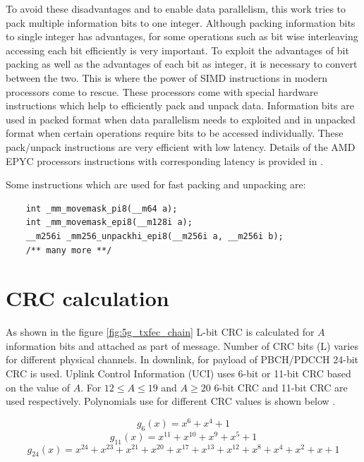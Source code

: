 To avoid these disadvantages and to enable data parallelism, this work tries to pack multiple information bits to one integer. Although packing information bits to single integer has advantages, for some operations such as bit wise interleaving accessing each bit efficiently is very important. To exploit the advantages of bit packing as well as the advantages of each bit as integer, it is necessary to convert between the two. This is where the power of SIMD instructions in modern processors come to rescue. These processors come with special hardware instructions which help to efficiently pack and unpack data. Information bits are used in packed format when data parallelism needs to exploited and in unpacked format when certain operations require bits to be accessed individually. These pack/unpack instructions are very efficient with low latency. Details of the AMD EPYC processors instructions with corresponding latency is provided in \cite{AgnerFog}.

Some instructions which are used for fast packing and unpacking are:
\begin{verbatim}
	int _mm_movemask_pi8(__m64 a);
	int _mm_movemask_epi8(__m128i a);
	__m256i _mm256_unpackhi_epi8(__m256i a, __m256i b);
	/** many more **/
\end{verbatim}


\section{CRC calculation}
As shown in the figure \ref{fig:5g_txfec_chain} L-bit CRC is calculated for $A$ information bits and attached as part of message. Number of CRC bits (L) varies for different physical channels. In downlink, for payload of PBCH/PDCCH 24-bit CRC is used. Uplink Control Information (UCI) uses 6-bit or 11-bit CRC based on the value of $A$. For $12 \leq A \leq 19$ and $A \geq 20$ 6-bit CRC and 11-bit CRC are used respectively. Polynomials use for different CRC values is shown below \cite{3gpp.38.212}.

\begin{equation} \label{crc_polynomial6}
g_{6}(x) = x^{6} + x^{4} + 1
\end{equation}
\begin{equation} \label{crc_polynomial11}
g_{11}(x) = x^{11} + x^{10} + x^{9} + x^{5} + 1
\end{equation}
\begin{equation} \label{crc_polynomial24}
g_{24}(x) = x^{24} + x^{23} + x^{21} + x^{20} + x^{17} + x^{13} + x^{12} + x^{8} + x^{4} + x^{2} + x + 1
\end{equation}

